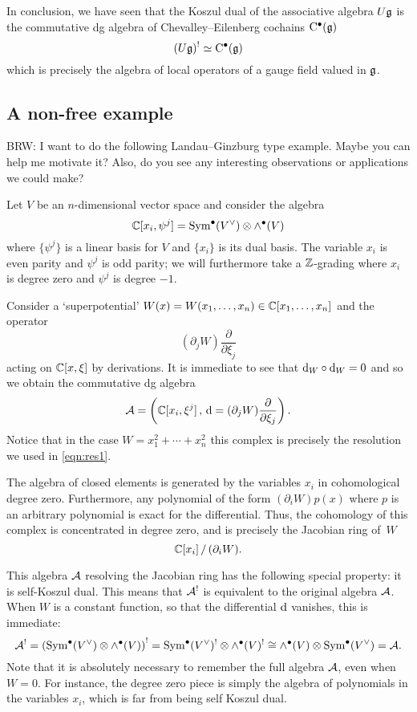 \documentclass[11pt]{amsart}
\def\brian#1{{\textcolor{blue!65!red}{BRW: {#1}}}}
\begin{document}
In conclusion, we have seen that the Koszul dual of the associative algebra $U \mathfrak g$ is the commutative dg algebra of Chevalley--Eilenberg cochains ${\rm C}^\bullet(\mathfrak g)$
\[
(U \mathfrak g)^! \simeq {\rm C}^\bullet (\mathfrak g) 
\]
which is precisely the algebra of local operators of a gauge field valued in $\mathfrak g$. 

\subsection{A non-free example} 

\brian{I want to do the following Landau--Ginzburg type example. Maybe you can help me motivate it?
Also, do you see any interesting observations or applications we could make?}

Let $V$ be an $n$-dimensional vector space and consider the algebra 
\[
\mathbb C[x_i, \psi^j] = \operatorname{Sym}^\bullet (V^\vee) \otimes \wedge^\bullet(V) 
\]
where $\{\psi^j\}$ is a linear basis for $V$ and $\{x_i\}$ is its dual basis.
The variable $x_i$ is even parity and $\psi^j$ is odd parity; we will furthermore take a $\mathbb Z$-grading where $x_i$ is degree zero and $\psi^j$ is degree $-1$. 

Consider a `superpotential' $W(x) = W(x_1,\ldots, x_n) \in \mathbb C[x_1,\ldots, x_n]$ and the operator 
\[
(\partial_j W) \frac{\partial}{\partial \xi_j}
\]
acting on $\mathbb C[x,\xi]$ by derivations. 
It is immediate to see that ${\rm d}_W \circ {\rm d}_W = 0$ and so we obtain the commutative dg algebra 
\[
\mathcal A = \left(\mathbb C[x_i, \xi^j] \, , \, {\rm d} = (\partial_j W) \frac{\partial}{\partial \xi_j} \right).
\]
Notice that in the case $W = x_1^2 + \cdots + x_n^2$ this complex is precisely the resolution we used in \eqref{eqn:res1}. 

The algebra of closed elements is generated by the variables $x_i$ in cohomological degree zero. 
Furthermore, any polynomial of the form $(\partial_i W) p(x)$ where $p$ is an arbitrary polynomial is exact for the differential. 
Thus, the cohomology of this complex is concentrated in degree zero, and is precisely the Jacobian ring of~$W$
\[
\mathbb C[x_i] \, / \, (\partial_i W) .
\]

This algebra $\mathcal A$ resolving the Jacobian ring has the following special property: it is self-Koszul dual. 
This means that $\mathcal A^!$ is equivalent to the original algebra $\mathcal A$. 
When $W$ is a constant function, so that the differential ${\rm d}$ vanishes, this is immediate:
\[
\mathcal A^! = \left(\operatorname{Sym}^\bullet (V^\vee) \otimes \wedge^\bullet(V)\right)^! = \operatorname{Sym}^\bullet (V^\vee)^! \otimes \wedge^\bullet(V)^! \cong \wedge^\bullet (V) \otimes \operatorname{Sym}^\bullet (V^\vee) = \mathcal A .
\]
Note that it is absolutely necessary to remember the full algebra $\mathcal A$, even when $W = 0$. 
For instance, the degree zero piece is simply the algebra of polynomials in the variables $x_i$, which is far from being self Koszul dual.
\end{document}
